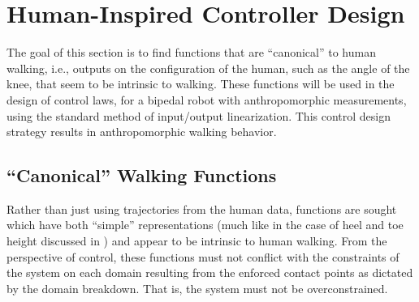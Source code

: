 

\section{Human-Inspired Controller Design} \noindent
The goal of this section is to find functions that are ``canonical'' to human walking, i.e., outputs on the configuration of the human, such as the angle of the knee, that seem to be intrinsic to walking. These functions will be used in the design of control laws, for a bipedal robot with anthropomorphic measurements, using the standard method of input/output linearization.\cite{Sastry99}\xspace This control design strategy results in anthropomorphic walking behavior.

\subsection{``Canonical'' Walking Functions} \label{sec:functions} \noindent
Rather than just using trajectories from the human data, functions are sought which have both ``simple'' representations (much like in the case of heel and toe height discussed in ) and appear to be intrinsic to human walking. From the perspective of control, these functions must not conflict with the constraints of the system on each domain resulting from the enforced contact points as dictated by the domain breakdown. That is, the system must not be overconstrained.

